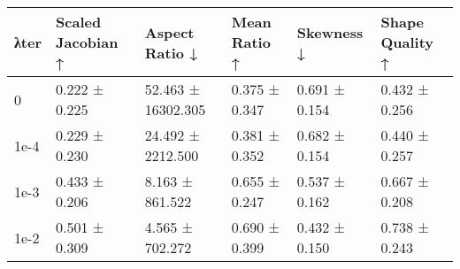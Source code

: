\begin{tabular}{llllll}
\toprule
λter & Scaled Jacobian ↑ & Aspect Ratio ↓ & Mean Ratio ↑ & Skewness ↓ & Shape Quality ↑ \\
\midrule
0 & 0.222 ± 0.225 & 52.463 ± 16302.305 & 0.375 ± 0.347 & 0.691 ± 0.154 & 0.432 ± 0.256 \\
1e-4 & 0.229 ± 0.230 & 24.492 ± 2212.500 & 0.381 ± 0.352 & 0.682 ± 0.154 & 0.440 ± 0.257 \\
1e-3 & 0.433 ± 0.206 & 8.163 ± 861.522 & 0.655 ± 0.247 & 0.537 ± 0.162 & 0.667 ± 0.208 \\
1e-2 & 0.501 ± 0.309 & 4.565 ± 702.272 & 0.690 ± 0.399 & 0.432 ± 0.150 & 0.738 ± 0.243 \\
\bottomrule
\end{tabular}
